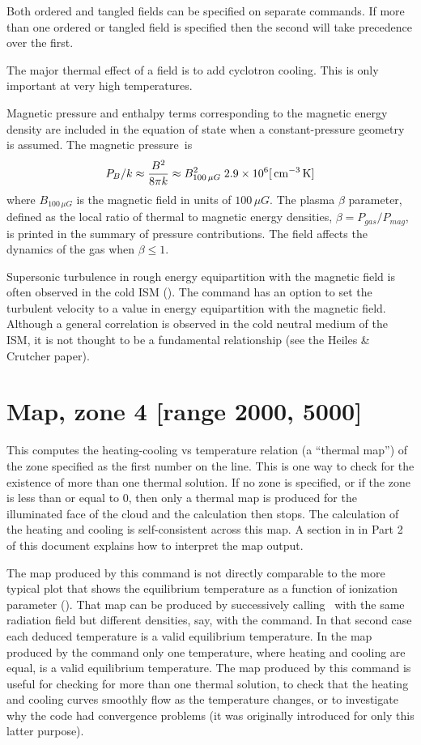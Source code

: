 Both ordered and tangled fields can be specified on separate commands.
If more than one ordered or tangled field is specified then the second
will take precedence over the first.

The major thermal effect of a field is to add cyclotron cooling.
This is only important at very high temperatures.

Magnetic pressure and enthalpy terms corresponding to the magnetic energy
density are included in the equation of state when a constant-pressure
geometry is assumed.
The magnetic pressure~is
\begin{equation}
P_B /k \approx \frac{{B^2 }}{{8\pi k}} \approx B_{100\,\mu G}^2
\;2.9 \times 10^6 [{\rm\thinspace cm^{-3}} {\rm\thinspace K}]
\end{equation}
where $B_{100\,\mu G}$ is
the magnetic field in units of $100\,\mu G$.
The plasma $\beta$ parameter, defined
as the local ratio of thermal to magnetic energy densities,
$\beta  = P_{gas} /P_{mag} $,
is printed in the summary of pressure contributions.
The field affects the dynamics of the gas when $\beta\le 1$.

Supersonic turbulence in rough energy equipartition with the magnetic
field is often observed in the cold ISM (\citealp{HeilesCrutcher2005}).
The
 command has an
 option
to set the turbulent velocity to a value in energy equipartition
with the magnetic field.
Although a general correlation is observed in the cold
neutral medium of the ISM, it is not thought to be a fundamental relationship (see the Heiles \& Crutcher paper).

\section{Map, zone 4 [range 2000, 5000]}

This computes the heating-cooling vs temperature relation (a ``thermal
map'') of the zone specified as the first number on the line.
This is one
way to check for the existence of more than one thermal solution.
If no
zone is specified, or if the zone is less than or equal to 0, then only
a thermal map is produced for the illuminated face of the cloud and the
calculation then stops.
The calculation of the heating and cooling is
self-consistent across this map.
A section in  in Part 2 of this
document explains how to interpret the map output.

The map produced by this command is not directly comparable to the more
typical plot that shows the equilibrium temperature as a function of
ionization parameter (\citealp{Krolik1981}).
That map can be
produced by successively calling \Cloudy\ with the same
radiation field
but different densities, say, with the  command.
In that second case each deduced temperature is a valid
equilibrium temperature.
In the map produced by the  command only one
temperature, where heating and cooling are equal, is a valid equilibrium
temperature.
The map produced by this command is useful for checking for
more than one thermal solution,
to check that the heating and cooling curves
smoothly flow as the temperature changes,
or to investigate why the code
had convergence problems
(it was originally introduced for only this latter purpose).

